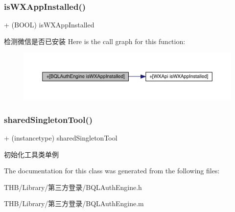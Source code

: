 \subsubsection{\texorpdfstring{is\+W\+X\+App\+Installed()}{isWXAppInstalled()}}
{\footnotesize\ttfamily + (B\+O\+OL) is\+W\+X\+App\+Installed \begin{DoxyParamCaption}{ }\end{DoxyParamCaption}}

检测微信是否已安装 Here is the call graph for this function\+:\nopagebreak
\begin{figure}[H]
\begin{center}
\leavevmode
\includegraphics[width=350pt]{interface_b_q_l_auth_engine_ab080654fd3117bee16016ec387a6e512_cgraph}
\end{center}
\end{figure}
\mbox{\label{interface_b_q_l_auth_engine_ae18d1835ec0364b5810d7bb79ba86f23}} 
\subsubsection{\texorpdfstring{shared\+Singleton\+Tool()}{sharedSingletonTool()}}
{\footnotesize\ttfamily + (instancetype) shared\+Singleton\+Tool \begin{DoxyParamCaption}{ }\end{DoxyParamCaption}}

初始化工具类单例 

The documentation for this class was generated from the following files\+:\begin{DoxyCompactItemize}
\item 
T\+H\+B/\+Library/第三方登录/B\+Q\+L\+Auth\+Engine.\+h\item 
T\+H\+B/\+Library/第三方登录/B\+Q\+L\+Auth\+Engine.\+m\end{DoxyCompactItemize}
